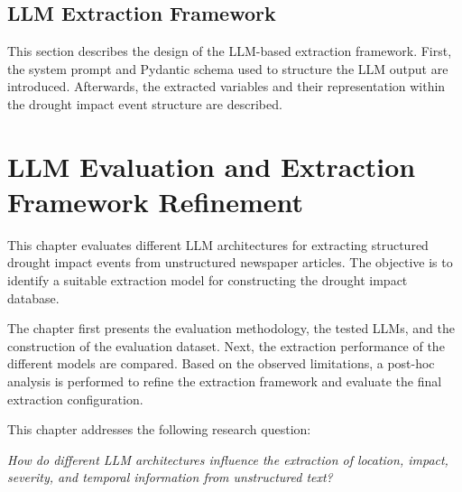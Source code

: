 \documentclass[11pt, a4paper, oneside]{book}
\begin{document}

\section{LLM Extraction Framework}


This section describes the design of the LLM-based extraction framework. First, the system prompt and Pydantic schema used to structure the LLM output are introduced. Afterwards, the extracted variables and their representation within the drought impact event structure are described.

\label{Extraction Framework Design}



% 




% 

\chapter{LLM Evaluation and Extraction Framework Refinement}

This chapter evaluates different LLM architectures for extracting structured drought impact events from unstructured newspaper articles. The objective is to identify a suitable extraction model for constructing the drought impact database.

The chapter first presents the evaluation methodology, the tested LLMs, and the construction of the evaluation dataset. Next, the extraction performance of the different models are compared. Based on the observed limitations, a post-hoc analysis is performed to refine the extraction framework and evaluate the final extraction configuration.

This chapter addresses the following research question:

\textit{How do different LLM architectures influence the extraction of location, impact, severity, and temporal information from unstructured text?}
\end{document}
